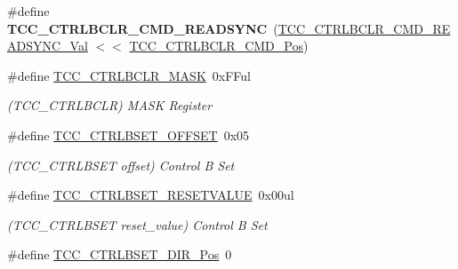 \begin{DoxyCompactItemize}
\item 
\hypertarget{group___s_a_m_l21___t_c_c_gad6f2630190e3c3f21a899043ca191e2f}{}\#define {\bfseries T\+C\+C\+\_\+\+C\+T\+R\+L\+B\+C\+L\+R\+\_\+\+C\+M\+D\+\_\+\+R\+E\+A\+D\+S\+Y\+N\+C}~(\hyperlink{group___s_a_m_l21___t_c_c_ga14d520b1455dd689144ab0f47d3950ac}{T\+C\+C\+\_\+\+C\+T\+R\+L\+B\+C\+L\+R\+\_\+\+C\+M\+D\+\_\+\+R\+E\+A\+D\+S\+Y\+N\+C\+\_\+\+Val} $<$$<$ \hyperlink{group___s_a_m_l21___t_c_c_gadd633ac48572abb4f937fcbf892ef5e3}{T\+C\+C\+\_\+\+C\+T\+R\+L\+B\+C\+L\+R\+\_\+\+C\+M\+D\+\_\+\+Pos})\label{group___s_a_m_l21___t_c_c_gad6f2630190e3c3f21a899043ca191e2f}

\item 
\hypertarget{group___s_a_m_l21___t_c_c_ga9f9805a652d03db290650272914955f3}{}\#define \hyperlink{group___s_a_m_l21___t_c_c_ga9f9805a652d03db290650272914955f3}{T\+C\+C\+\_\+\+C\+T\+R\+L\+B\+C\+L\+R\+\_\+\+M\+A\+S\+K}~0x\+F\+Ful\label{group___s_a_m_l21___t_c_c_ga9f9805a652d03db290650272914955f3}

\begin{DoxyCompactList}\small\item\em (T\+C\+C\+\_\+\+C\+T\+R\+L\+B\+C\+L\+R) M\+A\+S\+K Register \end{DoxyCompactList}\item 
\hypertarget{group___s_a_m_l21___t_c_c_ga2aa10be0cd000206887ae90dcc80a8eb}{}\#define \hyperlink{group___s_a_m_l21___t_c_c_ga2aa10be0cd000206887ae90dcc80a8eb}{T\+C\+C\+\_\+\+C\+T\+R\+L\+B\+S\+E\+T\+\_\+\+O\+F\+F\+S\+E\+T}~0x05\label{group___s_a_m_l21___t_c_c_ga2aa10be0cd000206887ae90dcc80a8eb}

\begin{DoxyCompactList}\small\item\em (T\+C\+C\+\_\+\+C\+T\+R\+L\+B\+S\+E\+T offset) Control B Set \end{DoxyCompactList}\item 
\hypertarget{group___s_a_m_l21___t_c_c_gaf9b842e73e73daf8dd9484cce9fff855}{}\#define \hyperlink{group___s_a_m_l21___t_c_c_gaf9b842e73e73daf8dd9484cce9fff855}{T\+C\+C\+\_\+\+C\+T\+R\+L\+B\+S\+E\+T\+\_\+\+R\+E\+S\+E\+T\+V\+A\+L\+U\+E}~0x00ul\label{group___s_a_m_l21___t_c_c_gaf9b842e73e73daf8dd9484cce9fff855}

\begin{DoxyCompactList}\small\item\em (T\+C\+C\+\_\+\+C\+T\+R\+L\+B\+S\+E\+T reset\+\_\+value) Control B Set \end{DoxyCompactList}\item 
\hypertarget{group___s_a_m_l21___t_c_c_ga14e20fa5a725b2703d41bc4d9ab49ac9}{}\#define \hyperlink{group___s_a_m_l21___t_c_c_ga14e20fa5a725b2703d41bc4d9ab49ac9}{T\+C\+C\+\_\+\+C\+T\+R\+L\+B\+S\+E\+T\+\_\+\+D\+I\+R\+\_\+\+Pos}~0\label{group___s_a_m_l21___t_c_c_ga14e20fa5a725b2703d41bc4d9ab49ac9}


\end{DoxyCompactItemize}
